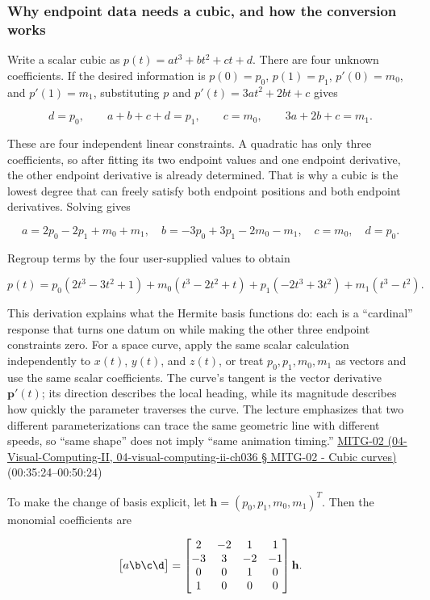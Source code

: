 \subsubsection{Why endpoint data needs a cubic, and how the conversion works}\label{why-endpoint-data-needs-a-cubic-and-how-the-conversion-works}

Write a scalar cubic as \(p(t)=at^3+bt^2+ct+d\). There are four unknown coefficients. If the desired information is \(p(0)=p_0\), \(p(1)=p_1\), \(p'(0)=m_0\), and \(p'(1)=m_1\), substituting \(p\) and \(p'(t)=3at^2+2bt+c\) gives

\[
d=p_0,\qquad a+b+c+d=p_1,\qquad c=m_0,\qquad 3a+2b+c=m_1.
\]

These are four independent linear constraints. A quadratic has only three coefficients, so after fitting its two endpoint values and one endpoint derivative, the other endpoint derivative is already determined. That is why a cubic is the lowest degree that can freely satisfy both endpoint positions and both endpoint derivatives. Solving gives

\[
a=2p_0-2p_1+m_0+m_1,\quad
b=-3p_0+3p_1-2m_0-m_1,\quad
c=m_0,\quad d=p_0.
\]

Regroup terms by the four user-supplied values to obtain

\[
p(t)=p_0(2t^3-3t^2+1)+m_0(t^3-2t^2+t)+p_1(-2t^3+3t^2)+m_1(t^3-t^2).
\]

This derivation explains what the Hermite basis functions do: each is a ``cardinal'' response that turns one datum on while making the other three endpoint constraints zero. For a space curve, apply the same scalar calculation independently to \(x(t)\), \(y(t)\), and \(z(t)\), or treat \(p_0,p_1,m_0,m_1\) as vectors and use the same scalar coefficients. The curve's tangent is the vector derivative \(\boldsymbol{p}'(t)\); its direction describes the local heading, while its magnitude describes how quickly the parameter traverses the curve. The lecture emphasizes that two different parameterizations can trace the same geometric line with different speeds, so ``same shape'' does not imply ``same animation timing.'' \href{}{MITG-02 (04-Visual-Computing-II, 04-visual-computing-ii-ch036 § MITG-02 - Cubic curves)} (00:35:24--00:50:24)

To make the change of basis explicit, let \(\mathbf{h}=(p_0,p_1,m_0,m_1)^T\). Then the monomial coefficients are

\[
\begin{bmatrix}a\b\c\d\end{bmatrix}=
\begin{bmatrix}
2&-2&1&1\\
-3&3&-2&-1\\
0&0&1&0\\
1&0&0&0
\end{bmatrix}\mathbf{h}.
\]


